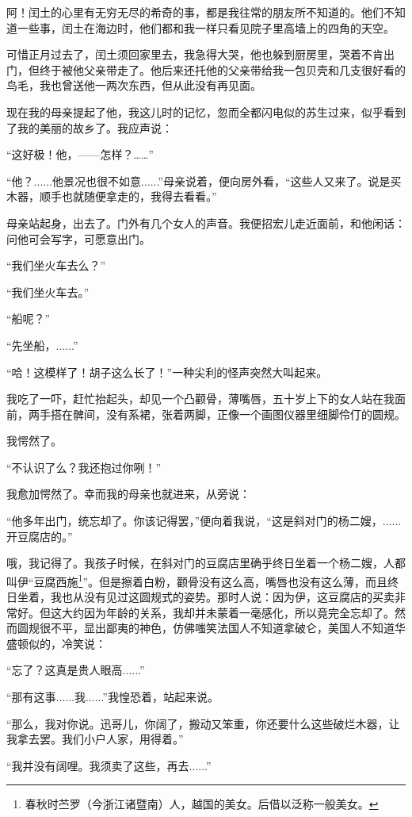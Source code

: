 \documentclass[12pt,UTF8]{ctexbook}
\begin{document}
阿！闰土的心里有无穷无尽的希奇的事，都是我往常的朋友所不知道的。他们不知道一些事，闰土在海边时，他们都和我一样只看见院子里高墙上的四角的天空。

可惜正月过去了，闰土须回家里去，我急得大哭，他也躲到厨房里，哭着不肯出门，但终于被他父亲带走了。他后来还托他的父亲带给我一包贝壳和几支很好看的鸟毛，我也曾送他一两次东西，但从此没有再见面。

现在我的母亲提起了他，我这儿时的记忆，忽而全都闪电似的苏生过来，似乎看到了我的美丽的故乡了。我应声说：

“这好极！他，——怎样？……”

“他？......他景况也很不如意......”母亲说着，便向房外看，“这些人又来了。说是买木器，顺手也就随便拿走的，我得去看看。”

母亲站起身，出去了。门外有几个女人的声音。我便招宏儿走近面前，和他闲话：问他可会写字，可愿意出门。

“我们坐火车去么？”

“我们坐火车去。”

“船呢？”

“先坐船，......”

“哈！这模样了！胡子这么长了！”一种尖利的怪声突然大叫起来。

我吃了一吓，赶忙抬起头，却见一个凸颧骨，薄嘴唇，五十岁上下的女人站在我面前，两手搭在髀间，没有系裙，张着两脚，正像一个画图仪器里细脚伶仃的圆规。

我愕然了。

“不认识了么？我还抱过你咧！”

我愈加愕然了。幸而我的母亲也就进来，从旁说：

“他多年出门，统忘却了。你该记得罢，”便向着我说，“这是斜对门的杨二嫂，......开豆腐店的。”

哦，我记得了。我孩子时候，在斜对门的豆腐店里确乎终日坐着一个杨二嫂，人都叫伊“豆腐西施\footnote{春秋时苎罗（今浙江诸暨南）人，越国的美女。后借以泛称一般美女。}”。但是擦着白粉，颧骨没有这么高，嘴唇也没有这么薄，而且终日坐着，我也从没有见过这圆规式的姿势。那时人说：因为伊，这豆腐店的买卖非常好。但这大约因为年龄的关系，我却并未蒙着一毫感化，所以竟完全忘却了。然而圆规很不平，显出鄙夷的神色，仿佛嗤笑法国人不知道拿破仑，美国人不知道华盛顿似的，冷笑说：

“忘了？这真是贵人眼高......”

“那有这事......我......”我惶恐着，站起来说。

“那么，我对你说。迅哥儿，你阔了，搬动又笨重，你还要什么这些破烂木器，让我拿去罢。我们小户人家，用得着。”

“我并没有阔哩。我须卖了这些，再去......”
\end{document}
